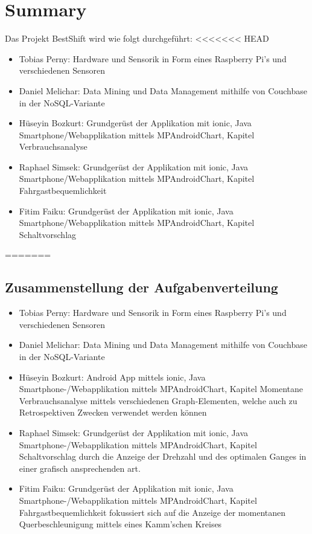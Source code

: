 \chapter{Summary}
Das Projekt BestShift wird wie folgt durchgeführt:
<<<<<<< HEAD
	\begin{itemize}
		\item Tobias Perny: Hardware und Sensorik in Form eines Raspberry Pi's und verschiedenen Sensoren 
		\item Daniel Melichar: Data Mining und Data Management mithilfe von Couchbase in der NoSQL-Variante
		\item Hüseyin Bozkurt: Grundgerüst der Applikation mit ionic, Java Smartphone/Webapplikation mittels MPAndroidChart, Kapitel Verbrauchsanalyse 
		\item Raphael Simsek:  Grundgerüst der Applikation mit ionic, Java Smartphone/Webapplikation mittels MPAndroidChart, Kapitel Fahrgastbequemlichkeit
		\item Fitim Faiku:     Grundgerüst der Applikation mit ionic, Java Smartphone/Webapplikation mittels MPAndroidChart, Kapitel Schaltvorschlag
	\end{itemize}

=======
\section{Zusammenstellung der Aufgabenverteilung}
 \begin{itemize}
	 \item Tobias Perny: Hardware und Sensorik in Form eines Raspberry Pi's und verschiedenen Sensoren 
	 \item Daniel Melichar: Data Mining und Data Management mithilfe von Couchbase in der NoSQL-Variante
	 \item Hüseyin Bozkurt: Android App mittels ionic, Java Smartphone-/Webapplikation mittels MPAndroidChart, Kapitel Momentane Verbrauchsanalyse mittels verschiedenen Graph-Elementen, welche auch zu Retrospektiven Zwecken verwendet werden können 
	 \item Raphael Simsek: Grundgerüst der Applikation mit ionic, Java Smartphone-/Webapplikation mittels MPAndroidChart, Kapitel Schaltvorschlag durch die Anzeige der Drehzahl und des optimalen Ganges in einer grafisch ansprechenden art.
	 \item Fitim Faiku: Grundgerüst der Applikation mit ionic, Java Smartphone-/Webapplikation mittels MPAndroidChart, Kapitel Fahrgastbequemlichkeit fokussiert sich auf die Anzeige der momentanen Querbeschleunigung mittels eines Kamm'schen Kreises
 \end{itemize}
\newline
